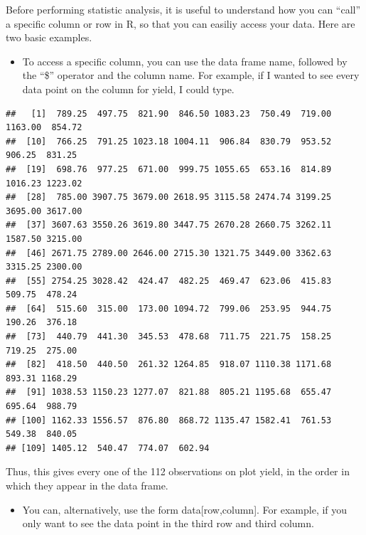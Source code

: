 \documentclass[
]{book}
\newenvironment{Shaded}{\begin{snugshade}}{\end{snugshade}}
\newcommand{\NormalTok}[1]{#1}
\newcommand{\SpecialCharTok}[1]{\textcolor[rgb]{0.00,0.00,0.00}{#1}}
\providecommand{\tightlist}{%
  \setlength{\itemsep}{0pt}\setlength{\parskip}{0pt}}
\begin{document}
Before performing statistic analysis, it is useful to understand how you can ``call'' a specific column or row in R, so that you can easiliy access your data. Here are two basic examples.

\begin{itemize}
\tightlist
\item
  To access a specific column, you can use the data frame name, followed by the ``\$'' operator and the column name. For example, if I wanted to see every data point on the column for yield, I could type.
\end{itemize}

\begin{Shaded}
\end{Shaded}

\begin{verbatim}
##   [1]  789.25  497.75  821.90  846.50 1083.23  750.49  719.00 1163.00  854.72
##  [10]  766.25  791.25 1023.18 1004.11  906.84  830.79  953.52  906.25  831.25
##  [19]  698.76  977.25  671.00  999.75 1055.65  653.16  814.89 1016.23 1223.02
##  [28]  785.00 3907.75 3679.00 2618.95 3115.58 2474.74 3199.25 3695.00 3617.00
##  [37] 3607.63 3550.26 3619.80 3447.75 2670.28 2660.75 3262.11 1587.50 3215.00
##  [46] 2671.75 2789.00 2646.00 2715.30 1321.75 3449.00 3362.63 3315.25 2300.00
##  [55] 2754.25 3028.42  424.47  482.25  469.47  623.06  415.83  509.75  478.24
##  [64]  515.60  315.00  173.00 1094.72  799.06  253.95  944.75  190.26  376.18
##  [73]  440.79  441.30  345.53  478.68  711.75  221.75  158.25  719.25  275.00
##  [82]  418.50  440.50  261.32 1264.85  918.07 1110.38 1171.68  893.31 1168.29
##  [91] 1038.53 1150.23 1277.07  821.88  805.21 1195.68  655.47  695.64  988.79
## [100] 1162.33 1556.57  876.80  868.72 1135.47 1582.41  761.53  549.38  840.05
## [109] 1405.12  540.47  774.07  602.94
\end{verbatim}

Thus, this gives every one of the 112 observations on plot yield, in the order in which they appear in the data frame.

\begin{itemize}
\tightlist
\item
  You can, alternatively, use the form data{[}row,column{]}. For example, if you only want to see the data point in the third row and third column.
\end{itemize}
\end{document}
